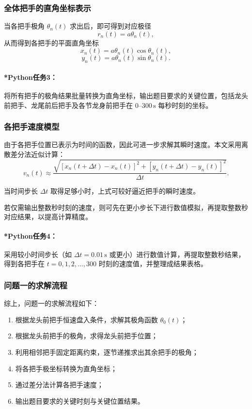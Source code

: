 \documentclass[12pt,a4paper]{ctexart}
\begin{document}
\subsubsection{全体把手的直角坐标表示}
当各把手极角 $\theta_n(t)$ 求出后，即可得到对应极径
\begin{equation}
r_n(t)=a\theta_n(t),
\end{equation}
从而得到各把手的平面直角坐标
\begin{equation}
x_n(t)=a\theta_n(t)\cos\theta_n(t),
\end{equation}
\begin{equation}
y_n(t)=a\theta_n(t)\sin\theta_n(t).
\end{equation}

\paragraph{*Python任务3：}
将所有把手的极角结果批量转换为直角坐标，输出题目要求的关键位置，包括龙头前把手、龙尾前后把手及各节龙身前把手在 $0$--$300\,\mathrm{s}$ 每秒时刻的坐标。

\subsubsection{各把手速度模型}
由于各把手位置已表示为时间的函数，因此可进一步求解其瞬时速度。本文采用离散差分法近似计算：
\begin{equation}
v_n(t)\approx
\frac{\sqrt{\left[x_n(t+\Delta t)-x_n(t)\right]^2+\left[y_n(t+\Delta t)-y_n(t)\right]^2}}{\Delta t}.
\end{equation}

当时间步长 $\Delta t$ 取得足够小时，上式可较好逼近把手的瞬时速度。

若仅需输出整数秒时刻的速度，则可先在更小步长下进行数值模拟，再提取整数秒对应结果，以提高计算精度。

\paragraph{*Python任务4：}
采用较小时间步长（如 $\Delta t=0.01\,\mathrm{s}$ 或更小）进行数值计算，再提取整数秒结果，得到各把手在 $t=0,1,2,\dots,300$ 时刻的速度值，并整理成结果表格。

\subsubsection{问题一的求解流程}
综上，问题一的求解流程如下：

\begin{enumerate}
    \item 根据龙头前把手恒速盘入条件，求解其极角函数 $\theta_0(t)$；
    \item 根据龙头前把手的极角，求得龙头前把手位置；
    \item 利用相邻把手固定距离约束，逐节递推求出其余把手的极角；
    \item 将各把手极坐标转换为直角坐标；
    \item 通过差分法计算各把手速度；
    \item 输出题目要求的关键时刻与关键位置结果。
\end{enumerate}
\end{document}
